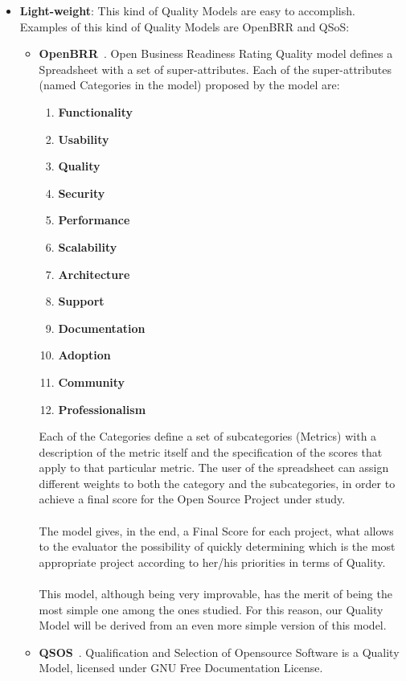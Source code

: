 \documentclass[11pt]{article}
\begin{document}
\begin{itemize}\itemsep0pt
\item{\textbf{Light-weight}}: This kind of Quality Models are easy to accomplish. Examples of this kind of Quality Models are OpenBRR and QSoS:
\begin{itemize}\itemsep0pt
\item{\textbf{OpenBRR}}~\cite{OPENBRR00}.
Open Business Readiness Rating Quality model defines a Spreadsheet with a set of super-attributes. Each of the super-attributes (named Categories in the model) proposed by the model are:
\begin{enumerate}\itemsep0pt
\item{\textbf{Functionality}}
\item{\textbf{Usability}}
\item{\textbf{Quality}}
\item{\textbf{Security}}
\item{\textbf{Performance}}
\item{\textbf{Scalability}}
\item{\textbf{Architecture}}
\item{\textbf{Support}}
\item{\textbf{Documentation}}
\item{\textbf{Adoption}}
\item{\textbf{Community}}
\item{\textbf{Professionalism}}
\end{enumerate}
Each of the Categories define a set of subcategories (Metrics) with a description of the metric itself and the specification of the scores that apply to that particular metric. The user of the spreadsheet can assign different weights to both the category and the subcategories, in order to achieve a final score for the Open Source Project under study.\\
\\
The model gives, in the end, a Final Score for each project, what allows to the evaluator the possibility of quickly determining which is the most appropriate project according to her/his priorities in terms of Quality.\\
\\
This model, although being very improvable, has the merit of being the most simple one among the ones studied. For this reason, our Quality Model will be derived from an even more simple version of this model.\\
\item{\textbf{QSOS}}~\cite{QSOS00}. Qualification and Selection of Opensource Software is a Quality Model, licensed under GNU Free Documentation License.\\

\end{itemize}
\end{itemize}
\end{document}
